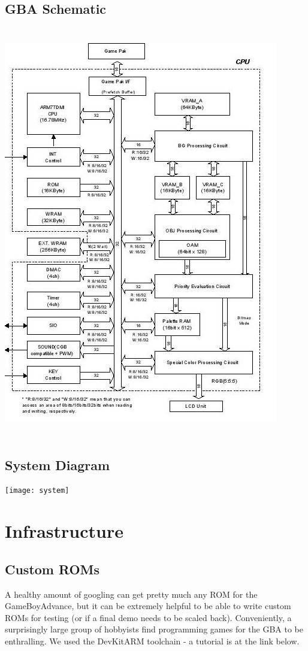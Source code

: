 \documentclass[11pt,a4paper]{article}
\begin{document}
	\subsection{GBA Schematic}
	\includegraphics[width=12cm, height=18cm, keepaspectratio=true]{gbaschematic}
	
	
	\subsection{System Diagram}
	\texttt{[image: system]}
	
	\section{Infrastructure}
	\subsection{Custom ROMs}
	A healthy amount of googling can get pretty much any ROM for the GameBoyAdvance, but it can be extremely helpful to be able to write custom ROMs for testing (or if a final demo needs to be scaled back). Conveniently, a surprisingly large group of hobbyists find programming games for the GBA to be enthralling. We used the DevKitARM toolchain - a tutorial is at the link below.\\
	
\end{document}
